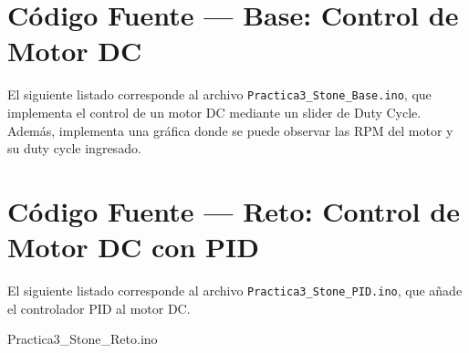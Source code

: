 \documentclass[journal, onecolumn]{IEEEtran}
\begin{document}

\newpage
\appendix

\section{Código Fuente --- Base: Control de Motor DC}

El siguiente listado corresponde al archivo \texttt{Practica3\_Stone\_Base.ino},
que implementa el control de un motor DC mediante un slider de Duty Cycle. Además, implementa una gráfica donde se puede observar las RPM del motor y su duty cycle ingresado.






\section{Código Fuente --- Reto: Control de Motor DC con PID}

El siguiente listado corresponde al archivo \texttt{Practica3\_Stone\_PID.ino},
que añade el controlador PID al motor DC.

 {Practica3_Stone_Reto.ino}
\end{document}

